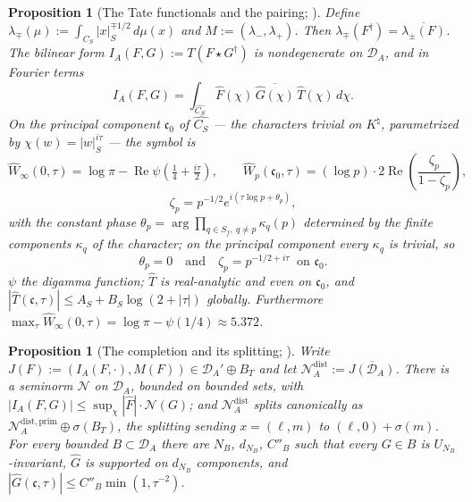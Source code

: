\documentclass[11pt]{amsart}
\newtheorem{proposition}[theorem]{Proposition}
\theoremstyle{definition}
\theoremstyle{remark}
\newcommand{\Rel}{\operatorname{Re}}
\newcommand{\Knat}{K^{\natural}}
\newcommand{\DA}{\mathcal D_A}
\begin{document}
\begin{proposition}[The Tate functionals and the pairing;
{\cite[Thms.~7.1, 7.2, 7.4, 8.4]{Companion}}]\label{prop:tate}
Define $\lambda_\mp(\mu):=\int_{C_S}|x|_S^{\mp1/2}\,d\mu(x)$ and
$M:=(\lambda_-,\lambda_+)$. Then $\lambda_\mp(F^\dagger)
=\overline{\lambda_\pm(F)}$. The bilinear form
$I_A(F,G):=T(F\star G^\dagger)$ is nondegenerate on $\DA$, and in Fourier
terms
\begin{equation}\label{eq:planch}
  I_A(F,G)=\int_{\widehat{C_S}}\widehat F(\chi)\,\overline{\widehat G(\chi)}\,
    \widehat T(\chi)\,d\chi .
\end{equation}
On the principal component $\mathfrak c_0$ of $\widehat{C_S}$ --- the
characters trivial on $\Knat$, parametrized by $\chi(w)=|w|_S^{i\tau}$ --- the
symbol is
\begin{equation}\label{eq:symbol}
  \widehat W_\infty(0,\tau)=\log\pi
    -\Rel\psi\!\left(\tfrac14+\tfrac{i\tau}2\right),
  \qquad
  \widehat W_p(\mathfrak c_0,\tau)=(\log p)\cdot2\Rel\!\left(
    \frac{\zeta_p}{1-\zeta_p}\right),
\end{equation}
\begin{equation}\label{eq:zetap}
  \zeta_p=p^{-1/2}e^{i(\tau\log p+\theta_p)},
\end{equation}
with the constant phase $\theta_p=\arg\prod_{q\in S_f,\ q\ne p}\kappa_q(p)$
determined by the finite components $\kappa_q$ of the character; on the
principal component every $\kappa_q$ is trivial, so
\begin{equation}\label{eq:nophase}
  \theta_p=0\quad\text{and}\quad\zeta_p=p^{-1/2+i\tau}\ \text{ on }
  \mathfrak c_0 .
\end{equation}
$\psi$ the digamma function; $\widehat T$ is real-analytic and even on
$\mathfrak c_0$, and $|\widehat T(\mathfrak c,\tau)|\le A_S+B_S\log(2+|\tau|)$
globally. Furthermore $\max_\tau\widehat W_\infty(0,\tau)
=\log\pi-\psi(1/4)\approx5.372$.
\end{proposition}

\begin{proposition}[The completion and its splitting;
{\cite[Lemma 8.12, Thms.~8.11, 8.14]{Companion}}]\label{prop:completion}
Write $J(F):=(I_A(F,\cdot),M(F))\in\DA'\oplus B_T$ and let
$\mathcal N_A^{\mathrm{dist}}:=\overline{J(\DA)}$. There is a seminorm
$\mathcal N$ on $\DA$, bounded on bounded sets, with
$|I_A(F,G)|\le\sup_\chi|\widehat F|\cdot\mathcal N(G)$; and
$\mathcal N_A^{\mathrm{dist}}$ splits canonically as
$\mathcal N_A^{\mathrm{dist,prim}}\oplus\sigma(B_T)$, the splitting sending
$x=(\ell,m)$ to $(\ell,0)+\sigma(m)$. For every bounded $B\subset\DA$ there
are $N_B$, $d_{N_B}$, $C''_B$ such that every $G\in B$ is
$U_{N_B}$-invariant, $\widehat G$ is supported on $d_{N_B}$ components, and
$|\widehat G(\mathfrak c,\tau)|\le C''_B\min(1,\tau^{-2})$.
\end{proposition}
\end{document}
